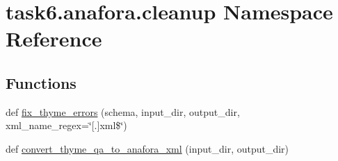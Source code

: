 \hypertarget{namespacetask6_1_1anafora_1_1cleanup}{}\section{task6.\+anafora.\+cleanup Namespace Reference}
\label{namespacetask6_1_1anafora_1_1cleanup}
\subsection*{Functions}
\begin{DoxyCompactItemize}
\item 
def \hyperlink{namespacetask6_1_1anafora_1_1cleanup_abbf9bc50537967d7a5c80a951dd2ab5c}{fix\+\_\+thyme\+\_\+errors} (schema, input\+\_\+dir, output\+\_\+dir, xml\+\_\+name\+\_\+regex=\char`\"{}\mbox{[}.\mbox{]}xml\$\char`\"{})
\item 
def \hyperlink{namespacetask6_1_1anafora_1_1cleanup_ad9c6cb84d76784a619cb7c9e72d026be}{convert\+\_\+thyme\+\_\+qa\+\_\+to\+\_\+anafora\+\_\+xml} (input\+\_\+dir, output\+\_\+dir)
\end{DoxyCompactItemize}
